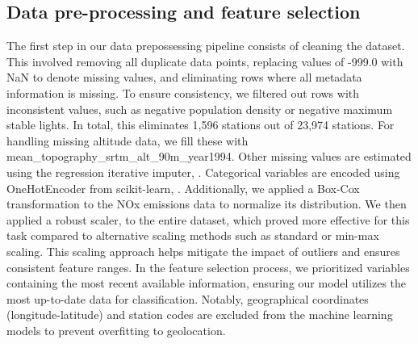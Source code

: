 \documentclass[gmd, manuscript]{copernicus}
\begin{document}
\subsection{Data pre-processing and feature selection}
The first step in our data prepossessing pipeline consists of cleaning the dataset. This involved removing all duplicate data points, replacing values of -999.0 with NaN to denote missing values, and eliminating rows where all metadata information is missing. To ensure consistency, we filtered out rows with inconsistent values, such as negative population density or negative maximum stable lights. In total, this eliminates 1,596 stations out of 23,974 stations.
For handling missing altitude data, we fill these with mean\_topography\_srtm\_alt\_90m\_year1994. Other missing values are estimated using the regression iterative imputer, \cite{rubinsteynfancyimpute}. 
Categorical variables are encoded using OneHotEncoder from scikit-learn, \cite{pedregosa2011scikit}. Additionally, we applied a Box-Cox transformation to the NOx emissions data to normalize its distribution.
We then applied a robust scaler, \cite{pedregosa2011scikit} to the entire dataset, which proved more effective for this task compared to alternative scaling methods such as standard or min-max scaling. This scaling approach helps mitigate the impact of outliers and ensures consistent feature ranges. In the feature selection process, we prioritized variables containing the most recent available information, ensuring our model utilizes the most up-to-date data for classification.
Notably, geographical coordinates (longitude-latitude) and station codes are excluded from the machine learning models to prevent overfitting to geolocation.
\end{document}
